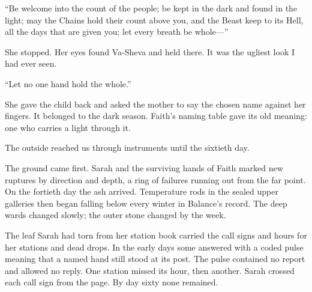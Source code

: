 ``Be welcome into the count of the people; be kept in the dark and found in the light; may the Chains hold their count above you, and the Beast keep to its Hell, all the days that are given you; let every breath be whole---''\par

She stopped. Her eyes found Va-Sheva and held there. It was the ugliest look I had ever seen.\par

``Let no one hand hold the whole.''\par

She gave the child back and asked the mother to say the chosen name against her fingers. It belonged to the dark season. Faith's naming table gave its old meaning: one who carries a light through it.\par

\ornament

The outside reached us through instruments until the sixtieth day.\par

The ground came first. Sarah and the surviving hands of Faith marked new ruptures by direction and depth, a ring of failures running out from the far point. On the fortieth day the ash arrived. Temperature rods in the sealed upper galleries then began falling below every winter in Balance's record. The deep wards changed slowly; the outer stone changed by the week.\par

The leaf Sarah had torn from her station book carried the call signs and hours for her stations and dead drops. In the early days some answered with a coded pulse meaning that a named hand still stood at its post. The pulse contained no report and allowed no reply. One station missed its hour, then another. Sarah crossed each call sign from the page. By day sixty none remained.\par

